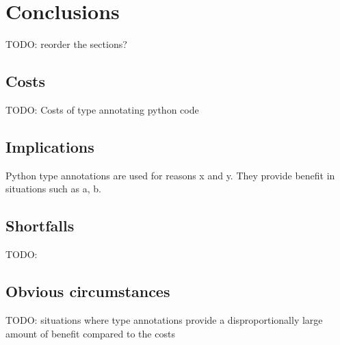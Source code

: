 \chapter{Conclusions\label{conclusions}}
TODO: reorder the sections?

\section{Costs}
TODO: Costs of type annotating python code

\section{Implications}
Python type annotations are used for reasons x and y. They provide benefit in situations such as a, b.

\section{Shortfalls}
TODO: 

\section{Obvious circumstances}
TODO: situations where type annotations provide a disproportionally large amount of benefit compared to the costs
